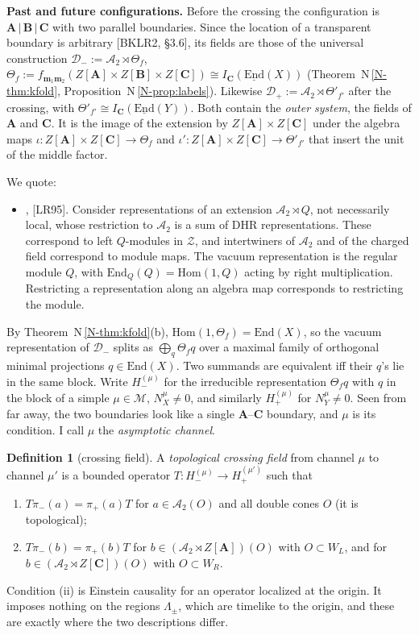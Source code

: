 \documentclass[11pt]{article}
\theoremstyle{definition}
\newtheorem{definition}[theorem]{Definition}
\theoremstyle{remark}
\newcommand{\cA}{\mathcal A}
\newcommand{\bfB}{\mathbf B}
\newcommand{\bfA}{\mathbf A}
\newcommand{\bfC}{\mathbf C}
\newcommand{\nref}[1]{N\,\ref{N-#1}}
\begin{document}
\textbf{Past and future configurations.} Before the crossing the configuration is $\bfA\,|\,\bfB\,|\,\bfC$ with two parallel boundaries. Since the location of a transparent boundary is arbitrary [BKLR2, \S3.6], its fields are those of the universal construction $\mathcal D_-:=\cA_2\rtimes\Theta_f$, $\Theta_f:=f_{\mathbf m_1\mathbf m_2}(Z[\bfA]\times Z[\bfB]\times Z[\bfC])\cong I_{\bfC}(\underline{\mathrm{End}}(X))$ (Theorem~\nref{thm:kfold}, Proposition~\nref{prop:labels}). Likewise $\mathcal D_+:=\cA_2\rtimes\Theta'_{f'}$ after the crossing, with $\Theta'_{f'}\cong I_{\bfC}(\underline{\mathrm{End}}(Y))$. Both contain the \emph{outer system}, the fields of $\bfA$ and $\bfC$. It is the image of the extension by $Z[\bfA]\times Z[\bfC]$ under the algebra maps $\iota\colon Z[\bfA]\times Z[\bfC]\to\Theta_f$ and $\iota'\colon Z[\bfA]\times Z[\bfC]\to\Theta'_{f'}$ that insert the unit of the middle factor.

We quote:
\begin{itemize}[leftmargin=2.6em]
\item[(R)] [BKLR, Ch.~4], [LR95]. Consider representations of an extension $\cA_2\rtimes Q$, not necessarily local, whose restriction to $\cA_2$ is a sum of DHR representations. These correspond to left $Q$-modules in $\mathcal Z$, and intertwiners of $\cA_2$ and of the charged field correspond to module maps. The vacuum representation is the regular module $Q$, with $\mathrm{End}_Q(Q)=\mathrm{Hom}(1,Q)$ acting by right multiplication. Restricting a representation along an algebra map corresponds to restricting the module.
\end{itemize}
By Theorem~\nref{thm:kfold}(b), $\mathrm{Hom}(1,\Theta_f)=\mathrm{End}(X)$, so the vacuum representation of $\mathcal D_-$ splits as $\bigoplus_q\Theta_fq$ over a maximal family of orthogonal minimal projections $q\in\mathrm{End}(X)$. Two summands are equivalent iff their $q$'s lie in the same block. Write $H_-^{(\mu)}$ for the irreducible representation $\Theta_fq$ with $q$ in the block of a simple $\mu\in\mathcal M$, $N^\mu_X\neq0$, and similarly $H_+^{(\mu)}$ for $N^\mu_Y\ne0$. Seen from far away, the two boundaries look like a single $\bfA$--$\bfC$ boundary, and $\mu$ is its condition. I call $\mu$ the \emph{asymptotic channel}.

\begin{definition}[crossing field]\label{def:crossing}
A \emph{topological crossing field} from channel $\mu$ to channel $\mu'$ is a bounded operator $T\colon H_-^{(\mu)}\to H_+^{(\mu')}$ such that
\begin{enumerate}[nosep,label=(\roman*)]
\item $T\pi_-(a)=\pi_+(a)T$ for $a\in\cA_2(O)$ and all double cones $O$ (it is topological);
\item $T\pi_-(b)=\pi_+(b)T$ for $b\in(\cA_2\rtimes Z[\bfA])(O)$ with $O\subset W_L$, and for $b\in(\cA_2\rtimes Z[\bfC])(O)$ with $O\subset W_R$.
\end{enumerate}
\end{definition}
Condition (ii) is Einstein causality for an operator localized at the origin. It imposes nothing on the regions $\Lambda_\pm$, which are timelike to the origin, and these are exactly where the two descriptions differ.
\end{document}

